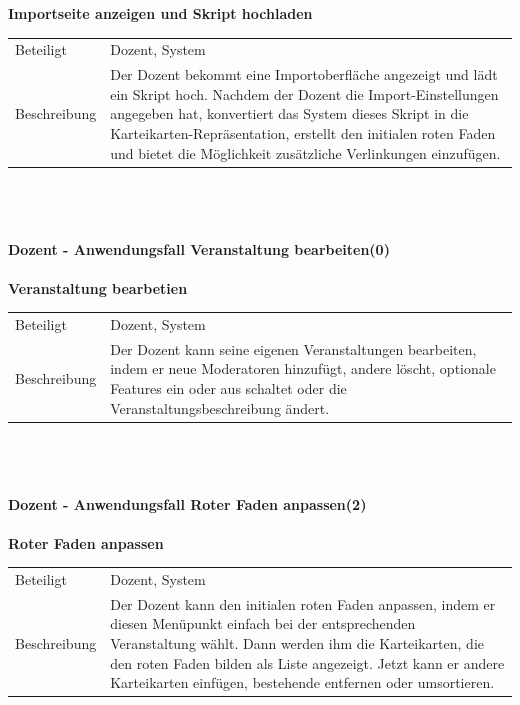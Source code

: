 \documentclass[12pt,a4paper]{article}
\begin{document}
{\textbf{Importseite anzeigen und Skript hochladen}\\
\begin{tabular}{l|p{12cm}}
\hline 
Beteiligt & Dozent, System \\ 
Beschreibung & Der Dozent bekommt eine Importoberfläche angezeigt und lädt ein Skript hoch. Nachdem der Dozent die Import-Einstellungen angegeben hat, konvertiert das System dieses Skript in die Karteikarten-Repräsentation, erstellt den initialen roten Faden und bietet die Möglichkeit zusätzliche Verlinkungen einzufügen. \\ 
\end{tabular}\\\\

\newpage

\paragraph{Dozent - Anwendungsfall \glqq Veranstaltung bearbeiten\grqq (0)}\mbox{}

\textbf{Veranstaltung bearbetien}\\
\begin{tabular}{l|p{12cm}}
\hline 
Beteiligt & Dozent, System \\ 
Beschreibung & Der Dozent kann seine eigenen Veranstaltungen bearbeiten, indem er neue Moderatoren hinzufügt, andere löscht, optionale Features ein oder aus schaltet oder die Veranstaltungsbeschreibung ändert. \\ 
\end{tabular}\\\\


\paragraph{Dozent - Anwendungsfall \glqq Roter Faden anpassen\grqq (2)}\mbox{}

\textbf{Roter Faden anpassen}\\
\begin{tabular}{l|p{12cm}}
\hline 
Beteiligt & Dozent, System \\ 
Beschreibung & Der Dozent kann den initialen roten Faden anpassen, indem er diesen Menüpunkt einfach bei der entsprechenden Veranstaltung wählt. Dann werden ihm die Karteikarten, die den roten Faden bilden als Liste angezeigt. Jetzt kann er andere Karteikarten einfügen, bestehende entfernen oder umsortieren. \\ 
\end{tabular}\\\\


}
\end{document}
